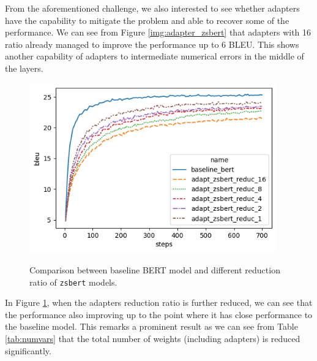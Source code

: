 From the aforementioned challenge, we also interested to see whether adapters have the capability to mitigate the problem and able to recover some of the performance. We can see from Figure \ref{img:adapter_zsbert} that adapters with 16 ratio already managed to improve the performance up to 6 BLEU. This shows another capability of adapters to intermediate numerical errors in the middle of the layers.

\begin{figure}[h]
    {\includegraphics[width=0.95\textwidth]{img/adapter_zsbert_ratio.png}}
    \centering
    \caption{Comparison between baseline BERT model and different reduction ratio of \texttt{zsbert} models.}
    \label{img:adapter_zsbert_ratio}
\end{figure}

In Figure \ref{img:adapter_zsbert_ratio}, when the adapters reduction ratio is further reduced, we can see that the performance also improving up to the point where it has close performance to the baseline model. This remarks a prominent result as we can see from Table \ref{tab:numvars} that the total number of weights (including adapters) is reduced significantly.

